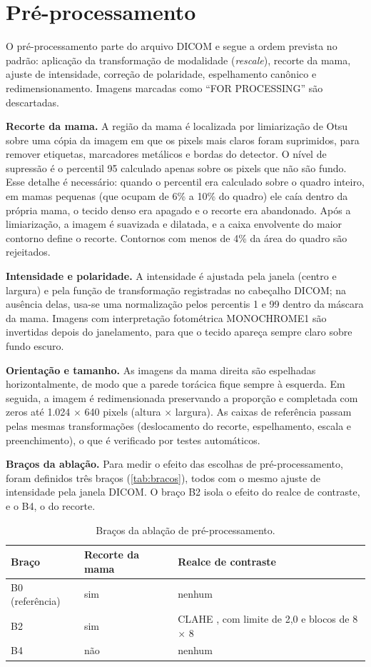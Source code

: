 \section{Pré-processamento}

O pré-processamento parte do arquivo DICOM e segue a ordem prevista no padrão: aplicação da transformação de modalidade (\textit{rescale}), recorte da mama, ajuste de intensidade, correção de polaridade, espelhamento canônico e redimensionamento. Imagens marcadas como ``FOR PROCESSING'' são descartadas.

\textbf{Recorte da mama.} A região da mama é localizada por limiarização de Otsu \cite{otsu1979} sobre uma cópia da imagem em que os pixels mais claros foram suprimidos, para remover etiquetas, marcadores metálicos e bordas do detector. O nível de supressão é o percentil 95 calculado apenas sobre os pixels que não são fundo. Esse detalhe é necessário: quando o percentil era calculado sobre o quadro inteiro, em mamas pequenas (que ocupam de 6\% a 10\% do quadro) ele caía dentro da própria mama, o tecido denso era apagado e o recorte era abandonado. Após a limiarização, a imagem é suavizada e dilatada, e a caixa envolvente do maior contorno define o recorte. Contornos com menos de 4\% da área do quadro são rejeitados.

\textbf{Intensidade e polaridade.} A intensidade é ajustada pela janela (centro e largura) e pela função de transformação registradas no cabeçalho DICOM; na ausência delas, usa-se uma normalização pelos percentis 1 e 99 dentro da máscara da mama. Imagens com interpretação fotométrica MONOCHROME1 são invertidas depois do janelamento, para que o tecido apareça sempre claro sobre fundo escuro.

\textbf{Orientação e tamanho.} As imagens da mama direita são espelhadas horizontalmente, de modo que a parede torácica fique sempre à esquerda. Em seguida, a imagem é redimensionada preservando a proporção e completada com zeros até 1.024 $\times$ 640 pixels (altura $\times$ largura). As caixas de referência passam pelas mesmas transformações (deslocamento do recorte, espelhamento, escala e preenchimento), o que é verificado por testes automáticos.

\textbf{Braços da ablação.} Para medir o efeito das escolhas de pré-processamento, foram definidos três braços (\autoref{tab:bracos}), todos com o mesmo ajuste de intensidade pela janela DICOM. O braço B2 isola o efeito do realce de contraste, e o B4, o do recorte.

\begin{table}[htb]
  \centering
  \caption{Braços da ablação de pré-processamento.}
  \label{tab:bracos}
  \begin{tabular}{@{}llp{6.5cm}@{}}
    \toprule
    Braço & Recorte da mama & Realce de contraste \\
    \midrule
    B0 (referência) & sim & nenhum \\
    B2 & sim & CLAHE \cite{zuiderveld1994clahe}, com limite de 2,0 e blocos de 8 $\times$ 8 \\
    B4 & não & nenhum \\
    \bottomrule
  \end{tabular}
\end{table}

